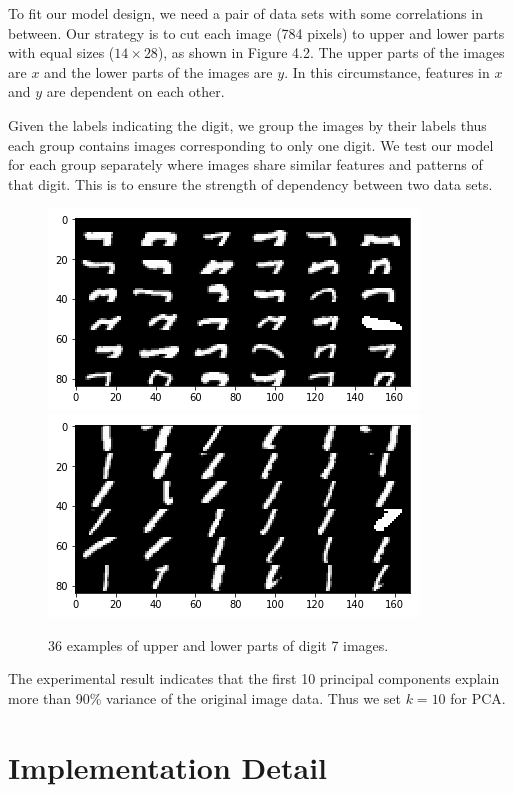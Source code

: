 \documentclass[12pt]{report} %
\begin{document}
To fit our model design, we need a pair of data sets with some correlations in between. Our strategy is to cut each image (784 pixels) to upper and lower parts with equal sizes ($14 \times 28$), as shown in Figure 4.2. The upper parts of the images are $x$ and the lower parts of the images are $y$. In this circumstance, features in $x$ and $y$ are dependent on each other.

Given the labels indicating the digit, we group the images by their labels thus each group contains images corresponding to only one digit. We test our model for each group separately where images share similar features and patterns of that digit. This is to ensure the strength of dependency between two data sets.
\begin{figure}[H]
	\centering
	\includegraphics[scale=0.9]{pictures/MNIST_up.png}
	\includegraphics[scale=0.9]{pictures/MNIST_down.png}
	\caption{36 examples of upper and lower parts of digit 7 images.}
	\label{fig:2}
\end{figure}
The experimental result indicates that the first 10 principal components explain more than 90\% variance of the original image data. Thus we set $k=10$ for PCA.

\section{Implementation Detail}
\end{document}
